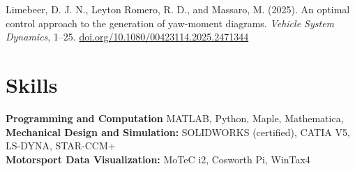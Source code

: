 \documentclass[12pt,letterpaper]{article} %
\begin{document}
Limebeer, D. J. N., Leyton Romero, R. D., and Massaro, M. (2025). An optimal control approach to the generation of yaw-moment diagrams. \textit{Vehicle System Dynamics}, 1–25. \href{https://doi.org/10.1080/00423114.2025.2471344}{doi.org/10.1080/00423114.2025.2471344}

\vspace{-10pt} %

\section*{Skills}
\textbf{Programming and Computation} MATLAB, Python, Maple, Mathematica, \\
\textbf{Mechanical Design and Simulation:} SOLIDWORKS (certified), CATIA V5, LS-DYNA, STAR-CCM+ \\
\textbf{Motorsport Data Visualization:} MoTeC i2, Cosworth Pi, WinTax4 \\



\end{document}
